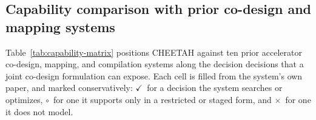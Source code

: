 %

\providecommand{\cmark}{\textcolor{cmgood}{\ensuremath{\checkmark}}}      %
\providecommand{\xmark}{\textcolor{cmbad}{\ensuremath{\times}}}           %
\providecommand{\pmark}{\textcolor{cmpart}{\ensuremath{\circ}}}           %
\providecommand{\rot}[1]{\rotatebox{90}{\parbox{2.75cm}{\raggedright #1}}}
\providecommand{\pnote}[1]{\pmark\textsuperscript{\,#1}}
\providecommand{\cnote}[1]{\cmark\textsuperscript{\,#1}}

\subsection{Capability comparison with prior co-design and mapping systems}
\label{sec:capability-matrix}

Table~\ref{tab:capability-matrix} positions CHEETAH against ten prior
accelerator co-design, mapping, and compilation systems along the decision decisions that a
joint co-design formulation can expose. Each cell is filled from the
system's own paper, and marked conservatively: \cmark~for a decision the system
searches or optimizes, \pmark~for one it supports only in a restricted or
staged form, and \xmark~for one it does not model.

